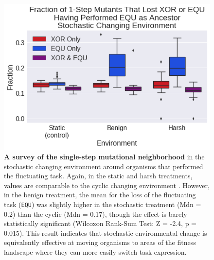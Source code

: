 \documentclass[PhD]{msu-thesis}
\begin{document}
	\begin{figure}[!h] %
	\includegraphics[trim={0.2cm 0 0 0.2cm},clip,width=0.75\columnwidth]{figures/CE/CSE_frac_1step__filtered__box.png}
	\caption{\textbf{A survey of the single-step mutational neighborhood} in the stochastic changing environment around organisms that performed the fluctuating task. Again, in the static and harsh treatments, values are comparable to the cyclic changing environment . However, in the benign treatment, the mean for the loss of the fluctuating task (\texttt{EQU}) was slightly higher in the stochastic treatment (Mdn = 0.2) than the cyclic (Mdn = 0.17), though the effect is barely statistically significant (Wilcoxon Rank-Sum Test: Z = -2.4, p = 0.015). This result indicates that stochastic environmental change is equivalently effective at moving organisms to areas of the fitness landscape where they can more easily switch task expression.%
	}\label{fig:CSE_single_step}
	\end{figure}
\end{document}
